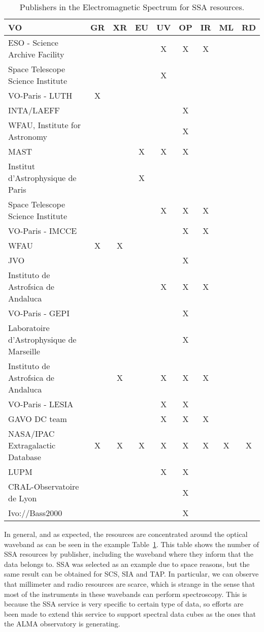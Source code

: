 \begin{table}
\begin{center}
\begin{tabular}{|l|c|c|c|c|c|c|c|c|}
\hline
\textbf{VO} & GR & XR & EU & UV & OP & IR & ML & RD \\
\hline
\hline
  ESO - Science Archive Facility  & & & & X & X & X & & \\
\hline
  Space Telescope Science Institute & & & & X & & & & \\
\hline
  VO-Paris - LUTH & X & & & & & & & \\
\hline
  INTA/LAEFF & & & & & X & & & \\
\hline
  WFAU, Institute for Astronomy & & & & & X & & & \\
\hline
  MAST & & & X & X & X & & & \\
\hline
  Institut d'Astrophysique de Paris & & & X & & & & & \\
\hline
  Space Telescope Science Institute & & & & X & X & X & & \\
\hline
  VO-Paris - IMCCE & & & & & X & X & & \\
\hline
  WFAU & X & X & & & & & & \\
\hline
  JVO & & & & & X & & & \\
\hline
  Instituto de Astrofsica de Andaluca & & & & X & X & X & & \\
\hline
  VO-Paris - GEPI  & & & & & X & & & \\
\hline
  Laboratoire d'Astrophysique de Marseille & & & & & X & & & \\
\hline
  Instituto de Astrofsica de Andaluca & & X & & X & X & X & & \\
\hline
  VO-Paris - LESIA & & & & X & X & & & \\
\hline
  GAVO DC team  & & & & X & X & X & & \\
\hline
  NASA/IPAC Extragalactic Database & X & X & X & X & X & X & X & X \\
\hline
  LUPM & & & & X & X & & & \\
\hline
  CRAL-Observatoire de Lyon & & & & & X & & & \\
\hline
  Ivo://Bass2000 & & & & & X & & & \\
\hline
\end{tabular}
\label{tab:SSAEMS}
\caption{Publishers in the Electromagnetic Spectrum for SSA resources.}
\end{center}
\end{table}

In general, and as expected, the resources are concentrated around the optical waveband as can be
seen in the example Table~\ref{tab:SSAEMS}. This table shows the number of SSA resources by publisher,
including the waveband where they inform that the data belongs to. SSA was selected as an example due to
space reasons, but the same result can be obtained for SCS, SIA and TAP. In particular, we can observe that
millimeter and radio resources are scarce, which is strange in the sense that most of the instruments in these
wavebands can perform spectroscopy. This is because the SSA service is very specific to certain type of
data, so efforts are been made to extend this service to support spectral data cubes as the ones that
the ALMA observatory is generating. 

